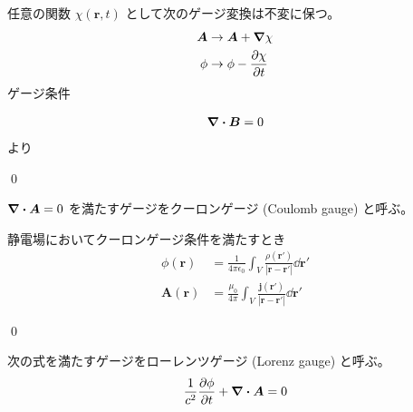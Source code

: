 \documentclass[uplatex,dvipdfmx,a4paper,11pt]{jlreq}
\makeatletter
\newcommand{\BB}{\bm{B}}
\renewcommand{\AA}{\bm{A}}
\newcommand{\rr}{\bm{r}}
\theoremstyle{definition}
\renewenvironment{proof}[1][\proofname]{\par
  \normalfont
  \topsep6\p@\@plus6\p@ \trivlist
  \item[\hskip\labelsep{\bfseries #1}\@addpunct{\bfseries}]\ignorespaces\quad\par
}{%
  \qed\endtrivlist\@endpefalse
}
\renewcommand\proofname{証明}
\makeatother
\begin{document}
\begin{theorem}[ゲージ変換]
  任意の関数 $\chi(\rr, t)$ として次のゲージ変換は不変に保つ。
  \begin{align}
    \AA  & \to \AA + \vnabla\chi    \\
    \phi & \to \phi - \pdv{\chi}{t}
  \end{align}
  ゲージ条件
\end{theorem}
\begin{proof}
  \begin{align}
    \vnabla\vdot\BB = 0
  \end{align}
  より

\end{proof}

\begin{definition}
  $\vnabla\vdot\AA = 0$ を満たすゲージをクーロンゲージ (Coulomb gauge) と呼ぶ。
\end{definition}

\begin{proposition}
  静電場においてクーロンゲージ条件を満たすとき
  \begin{align}
    \phi(\rr) & = \frac{1}{4\pi\epsilon_0}\int_V\frac{\rho(\rr')}{|\rr - \rr'|}\dd{\rr'} \\
    \AA(\rr)  & = \frac{\mu_0}{4\pi}\int_V\frac{\bm{j}(\rr')}{|\rr - \rr'|}\dd{\rr'}
  \end{align}
\end{proposition}
\begin{proof}

\end{proof}

\begin{definition}
  次の式を満たすゲージをローレンツゲージ (Lorenz gauge) と呼ぶ。
  \begin{align}
    \frac{1}{c^2}\pdv{\phi}{t} + \vnabla\vdot\AA = 0
  \end{align}
\end{definition}
\end{document}
